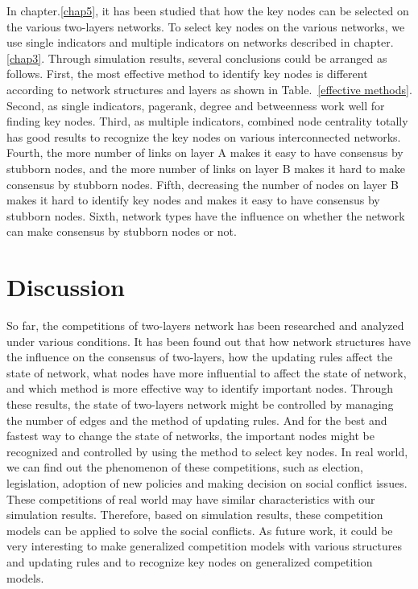 In chapter.\ref{chap5}, it has been studied that how the key nodes can be selected on the various two-layers networks. To select key nodes on the various networks, we use single indicators and multiple indicators on networks described in chapter.\ref{chap3}. Through simulation results, several conclusions could be arranged as follows.
First, the most effective method to identify key nodes is different according to network structures and layers as shown in Table.~\ref{effective methods}. Second, as single indicators, pagerank, degree and betweenness work well for finding key nodes. Third, as multiple indicators, combined node centrality totally has good results to recognize the key nodes on various interconnected networks. Fourth, the more number of links on layer A makes it easy to have consensus by stubborn nodes, and the more number of links on layer B makes it hard to make consensus by stubborn nodes. Fifth, decreasing the number of nodes on layer B makes it hard to identify key nodes and makes it easy to have consensus by stubborn nodes. Sixth, network types have the influence on whether the network can make consensus by stubborn nodes or not. 
  
\section{Discussion} 
So far, the competitions of two-layers network has been researched and analyzed under various conditions. It has been found out that how network structures have the influence on the consensus of two-layers, how the updating rules affect the state of network, what nodes have more influential to affect the state of network, and which method is more effective way to identify important nodes. Through these results, the state of two-layers network might be controlled by managing the number of edges and the method of updating rules. And for the best and fastest way to change the state of networks, the important nodes might be recognized and controlled by using the method to select key nodes.
In real world, we can find out the phenomenon of these competitions, such as election, legislation, adoption of new policies and making decision on social conflict issues. These competitions of real world may have similar characteristics with our simulation results. Therefore, based on simulation results, these competition models can be applied to solve the social conflicts. As future work, it could be very interesting to make generalized competition models with various structures and updating rules and to recognize key nodes on generalized competition models.   
